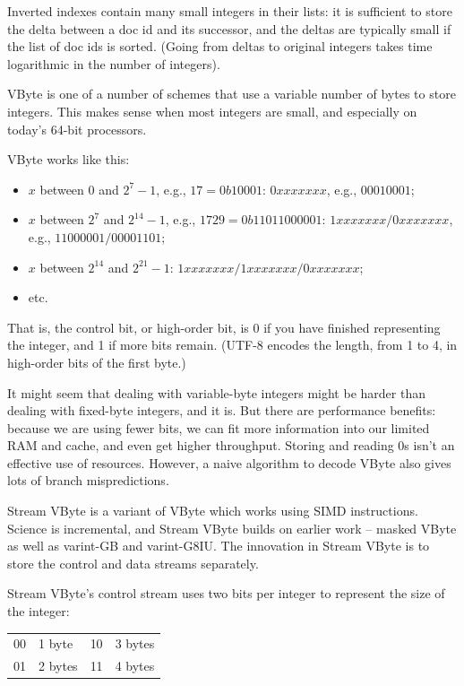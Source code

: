 Inverted indexes contain many small integers in their lists: it is
sufficient to store the delta between a doc id and its successor, and
the deltas are typically small if the list of doc ids is sorted.
(Going from deltas to original integers takes time logarithmic
in the number of integers).

VByte is one of a number of schemes that use a variable number of
bytes to store integers. This makes sense when most integers are
small, and especially on today's 64-bit processors.

VByte works like this:
\vspace*{-1em}
\begin{itemize}[noitemsep]
\item $x$ between 0 and $2^7-1$, e.g., $17 = 0b10001$: $0xxx xxxx$, e.g., $0001 0001$;
\item $x$ between $2^7$ and $2^{14}-1$, e.g., $1729 = 0b110 11000001$:
                   $1xxx xxxx/0xxx xxxx$, e.g., $1100 0001/0000 1101$;
\item $x$ between $2^{14}$ and $2^{21}-1$: $1xxx xxxx/1xxx xxxx/0xxx xxxx$;
\item etc.
\end{itemize}
That is, the control bit, or high-order bit, is 0 if you have finished representing the integer,
and 1 if more bits remain. (UTF-8 encodes the length, from 1 to 4, in high-order bits of the first byte.)

It might seem that dealing with variable-byte integers might be
harder than dealing with fixed-byte integers, and it is. But there are performance benefits: because we are
using fewer bits, we can fit more information into our limited RAM and
cache, and even get higher throughput. Storing and reading 0s isn't an effective
use of resources. However, a naive algorithm to decode VByte also gives
lots of branch mispredictions.

Stream VByte is a variant of VByte which works using SIMD instructions.
Science is incremental, and Stream VByte builds on earlier work -- masked VByte
as well as {\sc varint}-GB and {\sc varint}-G8IU. The innovation in
Stream VByte is to store the control and data streams separately.

Stream VByte's control stream uses two bits per integer to represent the size of the integer:
\begin{center}
\vspace*{-1em}
\begin{tabular}{ll@{~~~~~~~~}ll}
00 & 1 byte & 10 & 3 bytes\\
01 & 2 bytes & 11 & 4 bytes
\end{tabular}
\end{center}


